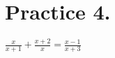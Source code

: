\documentclass[a4paper,12pt]{article}
\begin{document}
\section*{Practice 4.}

$\displaystyle\frac{x}{x+1}+\frac{x+2}{x}=\frac{x-1}{x+3}$
%
%
%
%
%
%
%
\end{document}
